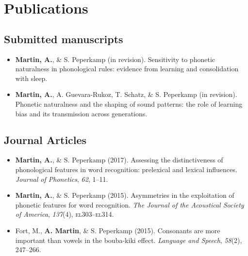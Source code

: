 \documentclass[a4paper, 10pt]{article}
\begin{document}
\section*{Publications}

\subsection*{Submitted manuscripts}

\begin{itemize}

\item \textbf{Martin, A.}, \& S. Peperkamp (in revision). Sensitivity to
  phonetic naturalness in phonological rules: evidence from learning
  and consolidation with sleep.

\item \textbf{Martin, A.}, A. Guevara-Rukoz, T. Schatz, \& S. Peperkamp
  (in revision). Phonetic naturalness and the shaping of sound
  patterns: the role of learning bias and its transmission across
  generations.

\end{itemize}

\subsection*{Journal Articles}

\begin{itemize}
\RaggedRight

\item \textbf{Martin, A.}, \& S. Peperkamp (2017). Assessing
  the distinctiveness of phonological features in word recognition:
  prelexical and lexical influences. \textit{Journal of Phonetics},
  \textit{62}, 1--11.

\item \textbf{Martin, A.}, \& S. Peperkamp
  (2015). Asymmetries in the exploitation of phonetic
  features for word recognition.  \textit{The Journal of the
    Acoustical Society of America}, \emph{137}(4), \textsc{el}303--\textsc{el}314.


\item Fort, M., \textbf{A. Martin}, \& S. Peperkamp (2015). {Consonants are more important than vowels in the
    bouba-kiki effect}. \textit{Language and Speech}, \emph{58}(2), 247--266.

                                                         
\end{itemize}
\end{document}

